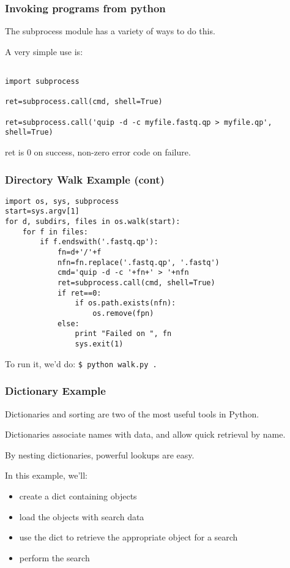 \documentclass[10pt]{beamer}
\newcommand\smallfont{\fontsize{8pt}{7.2}\selectfont}
\begin{document}
\begin{frame}[fragile]
\frametitle{Invoking programs from python}

The subprocess module has a variety of ways to do this.  
\vspace{2mm}

A very simple use is:

\smallfont
\begin{verbatim}

import subprocess

ret=subprocess.call(cmd, shell=True)

ret=subprocess.call('quip -d -c myfile.fastq.qp > myfile.qp', shell=True)
\end{verbatim}

ret is 0 on success, non-zero error code on failure.

\end{frame}
\begin{frame}[fragile]
\frametitle{Directory Walk Example (cont)}

\smallfont
\begin{verbatim}
import os, sys, subprocess
start=sys.argv[1]
for d, subdirs, files in os.walk(start):
    for f in files:
        if f.endswith('.fastq.qp'):
            fn=d+'/'+f
            nfn=fn.replace('.fastq.qp', '.fastq')
            cmd='quip -d -c '+fn+' > '+nfn
            ret=subprocess.call(cmd, shell=True)
            if ret==0:
                if os.path.exists(nfn):
                    os.remove(fpn)
            else:
                print "Failed on ", fn
                sys.exit(1)
\end{verbatim}

To run it, we'd do: \verb+$ python walk.py .+

\end{frame}

\begin{frame}[fragile]
\frametitle{Dictionary Example}

Dictionaries and sorting are two of the most useful tools in Python.  
\vspace{2mm}

Dictionaries associate names with data, and allow quick retrieval by name.
\vspace{2mm}

By nesting dictionaries, powerful lookups are easy.
\vspace{2mm}

In this example, we'll:

\begin{itemize}
\item create a dict containing objects
\item load the objects with search data
\item use the dict to retrieve the appropriate object for a search
\item perform the search
\end{itemize}

\end{frame}
\end{document}
